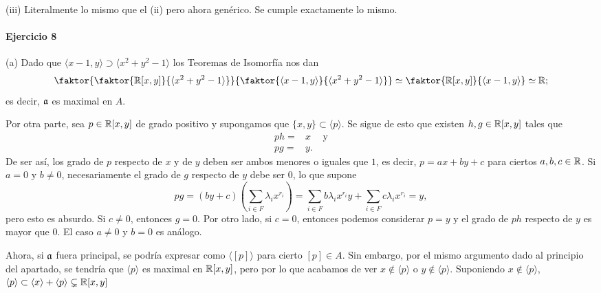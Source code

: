 \documentclass[../main.tex]{subfiles}
\begin{document}
(iii) Literalmente lo mismo que el (ii) pero ahora genérico. Se cumple exactamente lo mismo.

\paragraph{Ejercicio 8}
(a) Dado que $\langle x-1,y\rangle\supset\langle x^2+y^2-1\rangle$ los Teoremas de Isomorfía nos dan
$$\faktor{\faktor{\R[x,y]}{\langle x^2+y^2-1\rangle}}{\faktor{\langle x-1,y\rangle}{\langle x^2+y^2-1\rangle}}\simeq\faktor{\R[x,y]}{\langle x-1,y\rangle}\simeq\R;$$
es decir, $\mathfrak{a}$ es maximal en $A$.

Por otra parte, sea $p\in\mathbb{R}[x,y]$ de grado positivo y supongamos que $\{x,y\}\subset\langle p\rangle$. Se sigue de esto que existen $h,g\in\mathbb{R}[x,y]$ tales que
\begin{align*}
    ph=&x\hspace{15pt} \text{y}\\
    pg=&y.
\end{align*}
De ser así, los grado de $p$ respecto de $x$ y de $y$ deben ser ambos menores o iguales que $1$, es decir, $p=ax+by+c$ para ciertos $a,b,c\in\mathbb{R}$. Si $a=0$ y $b\neq 0$, necesariamente el grado de $g$ respecto de $y$ debe ser $0$, lo que supone
$$pg=(by+c)\left(\sum_{i\in F}\lambda_ix^{r_i}\right)=\sum_{i\in F}b\lambda_ix^{r_i}y+\sum_{i\in F}c\lambda_i x^{r_i}=y,$$
pero esto es absurdo. Si $c\neq0$, entonces $g=0$. Por otro lado, si $c=0$, entonces podemos considerar $p=y$ y el grado de $ph$ respecto de $y$ es mayor que 0.
El caso $a\neq0$ y $b=0$ es análogo.

Ahora, si $\mathfrak{a}$ fuera principal, se podría expresar como $\langle[p]\rangle$ para cierto $[p]\in A$. Sin embargo, por el mismo argumento dado al principio del apartado, se tendría que $\langle p\rangle$ es maximal en $\mathbb{R}[x,y]$, pero por lo que acabamos de ver $x\notin\langle p\rangle$ o $y\notin\langle p\rangle$. Suponiendo $x\notin \langle p\rangle$, $\langle p\rangle\subset\langle x\rangle +\langle p\rangle\subsetneq\mathbb{R}[x,y]$
\end{document}

